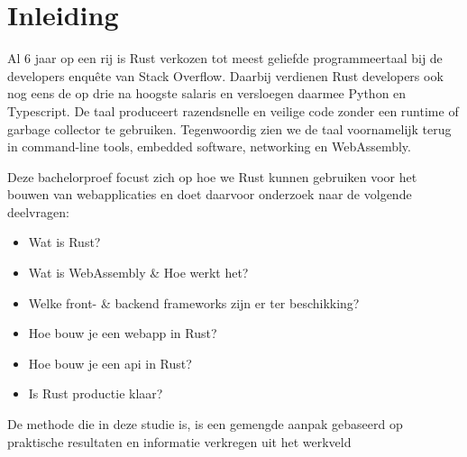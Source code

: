 \chapter{Inleiding}

Al 6 jaar op een rij is Rust verkozen tot meest geliefde programmeertaal bij de developers enquête
van Stack Overflow. Daarbij verdienen Rust developers ook nog eens de op drie na hoogste salaris en
versloegen daarmee Python en Typescript. \cite{so_enquete} De taal produceert razendsnelle en
veilige code zonder een runtime of garbage collector te gebruiken. Tegenwoordig zien we de taal
voornamelijk terug in command-line tools, embedded software, networking en WebAssembly. 

Deze bachelorproef focust zich op hoe we Rust kunnen gebruiken voor het bouwen van webapplicaties en
doet daarvoor onderzoek naar de volgende deelvragen:
\begin{itemize}
  \item Wat is Rust?
  \item Wat is WebAssembly \& Hoe werkt het?
  \item Welke front- \& backend frameworks zijn er ter beschikking?
  \item Hoe bouw je een webapp in Rust?
  \item Hoe bouw je een api in Rust?
  \item Is Rust productie klaar?
\end{itemize}

De methode die in deze studie is, is een gemengde aanpak gebaseerd op praktische resultaten en
informatie verkregen uit het werkveld
